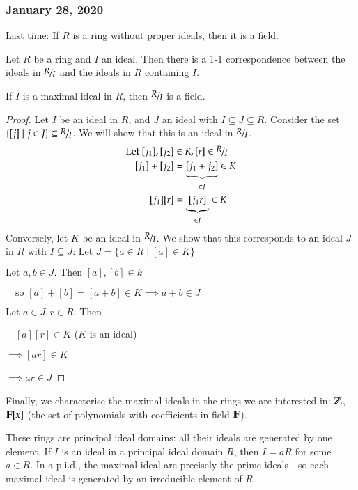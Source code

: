 \subsubsection*{January 28, 2020}

Last time: If $R$ is a ring without proper ideals, then it is a field. 

\begin{proposition}
	Let $R$ be a ring and $I$ an ideal. Then there is a 1-1 correspondence between the ideals in $\nicefrac{R}{I}$ and the ideals in $R$ containing $I$. 
\end{proposition}
\begin{corollary}
	If $I$ is a maximal ideal in $R$, then $\nicefrac{R}{I}$ is a field. 
\end{corollary}
\begin{proof}
	Let $I$ be an ideal in $R$, and $J$ an ideal with $I\subseteq J \subseteq R$. Consider the set $\{[j]\mid j\in J\}\subseteq \nicefrac{R}{I}$. We will show that this is an ideal in $\nicefrac{R}{I}$. 
	\begin{align*}
		\text{Let }[j_1],[j_2]&\in K, [r]\in \nicefrac{R}{I} \\
		[j_1]+[j_2]&=\underbrace{[j_1+j_2]}_{\in J}\in K \\
		[j_1][r]&=\underbrace{[j_1r]}_{\in J}\in K
	\end{align*}
	Conversely, let $K$ be an ideal in $\nicefrac{R}{I}$. We show that this corresponds to an ideal $J$ in $R$ with $I\subseteq J$: 
	Let $J=\{a\in R\mid [a]\in K\}$
	
	$\text{Let }a,b \in J\text{. Then }[a],[b]\in k$
	
	$\quad \text{so }[a] + [b] = [a + b]\in K \implies a + b \in J$
	
	$\text{Let }a\in J, r\in R\text{. Then}$
	
	$\quad [a][r]\in K$ ($K$ is an ideal)
	
	$\implies [ar]\in K$
	
	$\implies ar\in J$
	\end{proof}

Finally, we characterise the maximal ideals in the rings we are interested in: $\mathbb{Z}$, $\mathbb{F}[x]$ (the set of polynomials with coefficients in field $\mathbb{F}$). 

These rings are principal ideal domains: all their ideals are generated by one element. If $I$ is an ideal in a principal ideal domain $R$, then $I=aR$ for some $a\in R$. In a p.i.d., the maximal ideal are precisely the prime ideals---so each maximal ideal is generated by an irreducible element of $R$. 


